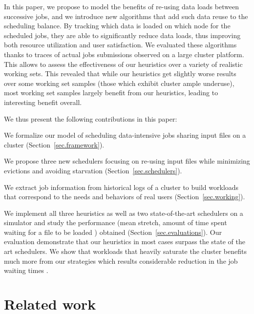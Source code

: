 \documentclass[sigconf,review,anonymous]{acmart}
\newcommand{\rev}[1]{{\color{blue}{#1}}}
\begin{document}
In this paper, we propose to model the benefits of re-using data loads
between successive jobs, and we introduce new algorithms that add such
data reuse to the scheduling balance. By tracking which data is loaded
on which node for the scheduled jobs, they are able to significantly
reduce data loads, thus improving both resource utilization and user
satisfaction. We evaluated these algorithms thanks to traces of actual
jobs submissions observed on a large cluster platform. This allows to
assess the effectiveness of our heuristics over a variety of realistic
working sets. This revealed that while our heuristics get slightly worse
results over some working set samples (those which exhibit cluster ample
underuse), most working set samples largely benefit from our heuristics,
leading to interesting benefit overall.

We thus present the following contributions in this paper:
\begin{compactenum}
	\item We formalize our model of scheduling data-intensive jobs sharing input files on a cluster (Section~\ref{sec.framework}).
	\item We propose three new schedulers focusing on re-using input files while minimizing evictions and avoiding starvation (Section~\ref{sec.schedulers}).
	\item We extract job information from historical logs of a cluster to build workloads that correspond to the needs and behaviors of real users (Section~\ref{sec.working}).
	\item We implement all three heuristics as well as two state-of-the-art schedulers on a simulator and study the performance (mean stretch, amount of time spent waiting for a file to be loaded \rev{and number of core hours}) obtained \rev{after scheduling almost 2 millions jobs} (Section~\ref{sec.evaluations}).
	Our evaluation demonstrate that our heuristics in most cases surpass the state of the art schedulers.
	We show that workloads that heavily saturate the cluster
    benefits much more from our strategies which results
    considerable reduction in the job waiting times \rev{as well as the total core hours}.
\end{compactenum}
\rev{We used simulations to avoid dirupting users on a production cluster, but our strategies could be implemented on the Slurm workload by asking the users to flag the input file they are using.}

\section{Related work}\label{sec.related_work}
\end{document}
